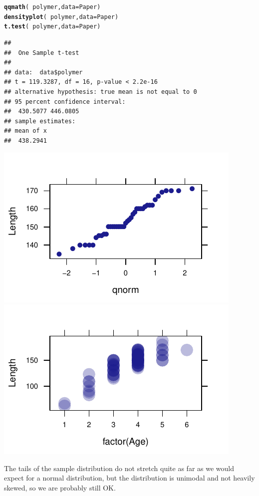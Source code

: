\documentclass[twoside]{book}\usepackage[]{graphicx}\usepackage[]{xcolor}
\makeatletter
\def\maxwidth{ %
  \ifdim\Gin@nat@width>\linewidth
    \linewidth
  \else
    \Gin@nat@width
  \fi
}
\newcommand{\hlopt}[1]{\textcolor[rgb]{0,0,0}{#1}}%
\newcommand{\hlstd}[1]{\textcolor[rgb]{0.345,0.345,0.345}{#1}}%
\newcommand{\hlkwc}[1]{\textcolor[rgb]{0.333,0.667,0.333}{#1}}%
\newcommand{\hlkwd}[1]{\textcolor[rgb]{0.737,0.353,0.396}{\textbf{#1}}}%
\newenvironment{kframe}{%
 \def\at@end@of@kframe{}%
 \ifinner\ifhmode%
  \def\at@end@of@kframe{\end{minipage}}%
  \begin{minipage}{\columnwidth}%
 \fi\fi%
 \def\FrameCommand##1{\hskip\@totalleftmargin \hskip-\fboxsep
 \colorbox{shadecolor}{##1}\hskip-\fboxsep
     \hskip-\linewidth \hskip-\@totalleftmargin \hskip\columnwidth}%
 \MakeFramed {\advance\hsize-\width
   \@totalleftmargin\z@ \linewidth\hsize
   \@setminipage}}%
 {\par\unskip\endMakeFramed%
 \at@end@of@kframe}
\newenvironment{knitrout}{}{} %
\makeatother
\begin{document}
\begin{solution}
\begin{knitrout}
\color{fgcolor}\begin{kframe}
\begin{alltt}
\hlkwd{qqmath}\hlstd{(}\hlopt{~}\hlstd{polymer,} \hlkwc{data} \hlstd{= Paper)}
\hlkwd{densityplot}\hlstd{(}\hlopt{~}\hlstd{polymer,} \hlkwc{data} \hlstd{= Paper)}
\hlkwd{t.test}\hlstd{(}\hlopt{~}\hlstd{polymer,} \hlkwc{data} \hlstd{= Paper)}
\end{alltt}
\begin{verbatim}
## 
## 	One Sample t-test
## 
## data:  data$polymer
## t = 119.3287, df = 16, p-value < 2.2e-16
## alternative hypothesis: true mean is not equal to 0
## 95 percent confidence interval:
##  430.5077 446.0805
## sample estimates:
## mean of x 
##  438.2941
\end{verbatim}
\end{kframe}

{\centering \includegraphics[width=\maxwidth]{figures/fig-unnamed-chunk-151-1} 
\includegraphics[width=\maxwidth]{figures/fig-unnamed-chunk-151-2} 

}



\end{knitrout}
The tails of the sample distribution do not stretch quite as far as we would expect 
for a normal distribution, but the distribution is unimodal and not heavily skewed,
so we are probably still OK.
\end{solution}
\end{document}
